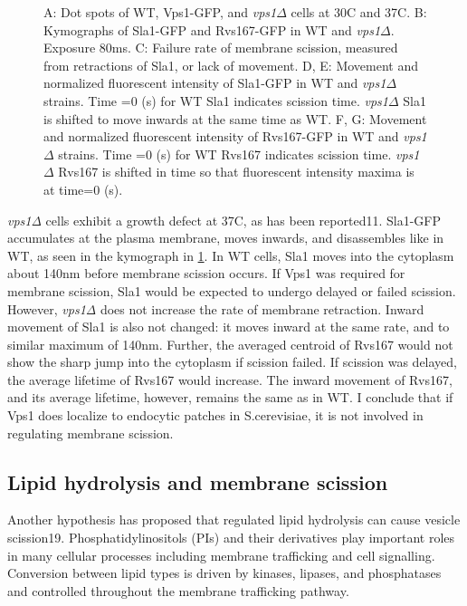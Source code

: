 \begin{figure}
	{A: Dot spots of WT, Vps1-GFP, and \textit{vps1$\Delta$} cells at 30C and 37C. 
		B: Kymographs of Sla1-GFP and Rvs167-GFP in WT and \textit{vps1$\Delta$}. Exposure 80ms.  
		C: Failure rate of membrane scission, measured from retractions of Sla1, or lack of movement. 
		D, E: Movement and normalized fluorescent intensity of Sla1-GFP in WT and \textit{vps1$\Delta$} strains. Time =0 (s) for WT Sla1 indicates scission time. \textit{vps1$\Delta$} Sla1  is shifted to move inwards at the same time as WT. 
		F, G: Movement and normalized fluorescent intensity of Rvs167-GFP in WT and \textit{vps1$\Delta$} strains. Time =0 (s) for WT Rvs167 indicates scission time. \textit{vps1$\Delta$} Rvs167 is shifted in time so that fluorescent intensity maxima is at time=0 (s).
		\label{fig4_vpsdel}}
	\end{figure}
	
	
	\vspace{5mm}
	\textit{vps1Δ }cells exhibit a growth defect at 37C, as has been reported11. Sla1-GFP accumulates at the plasma membrane, moves inwards, and disassembles like in WT, as seen in the kymograph in \ref{fig4_vpsdel}. In WT cells, Sla1 moves into the cytoplasm about 140nm before membrane scission occurs. If Vps1 was required for membrane scission, Sla1 would be expected to undergo delayed or failed scission. However, \textit{vps1Δ} does not increase the rate of membrane retraction. Inward movement of Sla1 is also not changed: it moves inward at the same rate, and to similar maximum of 140nm. Further, the averaged centroid of Rvs167 would not show the sharp jump into the cytoplasm if scission failed. If scission was delayed, the average lifetime of Rvs167 would increase. The inward movement of Rvs167, and its average lifetime, however, remains the same as in WT. I conclude that if Vps1 does localize to endocytic patches in S.cerevisiae, it is not involved in regulating membrane scission.  


	\subsection{Lipid hydrolysis and membrane scission}
	
	Another hypothesis has proposed that regulated lipid hydrolysis can cause vesicle scission19. Phosphatidylinositols (PIs) and their derivatives play important roles in many cellular processes including membrane trafficking and cell signalling. Conversion between lipid types is driven by kinases, lipases, and phosphatases and controlled throughout the membrane trafficking pathway. 


